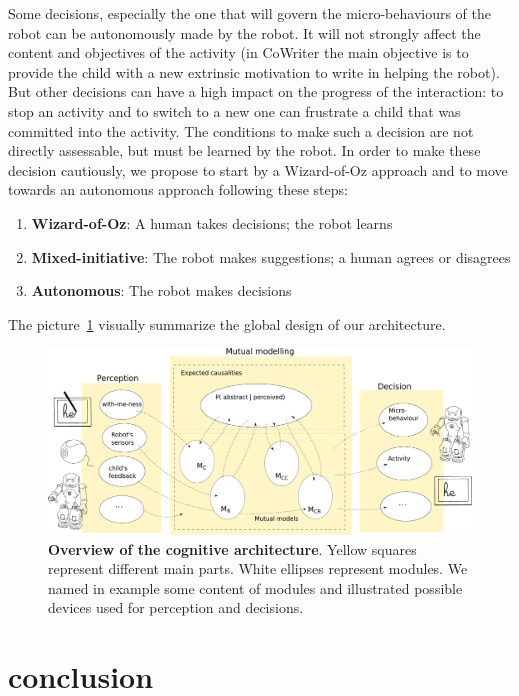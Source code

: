\documentclass[conference]{IEEEtran}
\begin{document}
Some decisions, especially the one that will govern the micro-behaviours of the robot can be autonomously made by the robot. It will not strongly affect the content and objectives of the activity (in CoWriter the main objective is to provide the child with a new extrinsic motivation to write in helping the robot). But other decisions can have a high impact on the progress of the interaction: to stop an activity and to switch to a new one can frustrate a child that was committed into the activity. The conditions to make such a decision are not directly assessable, but must be learned by the robot. In order to make these decision cautiously, we propose to start by a Wizard-of-Oz approach and to move towards an autonomous approach following these steps: 
\begin{enumerate}
\item \textbf{Wizard-of-Oz}: A human takes decisions; the robot learns
\item \textbf{Mixed-initiative}: The robot makes suggestions; a human agrees or disagrees
\item \textbf{Autonomous}: The robot makes decisions
\end{enumerate}

The picture~\ref{cog} visually summarize the global design of our architecture. 

\begin{figure}[!]
\centering
\includegraphics[width=1\columnwidth]{cognitive_archi}
\caption{\small\textbf{Overview of the cognitive architecture}. Yellow squares represent different main parts. White ellipses represent modules. We named in example some content of modules and illustrated possible devices used for perception and decisions. }
\label{cog}
\end{figure}

\section{conclusion}
\end{document}
